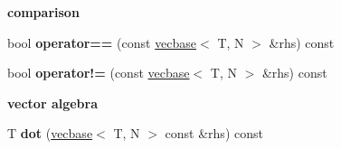 \begin{Indent}{\bf comparison}\par
{\em \label{_amgrp347cd68a17ba31d02e83262794a3c9e3}
 }\begin{DoxyCompactItemize}
\item 
\hypertarget{classmath_1_1vecbase_a81f417a49e0e2c3e4e76b0799cbc0ec2}{
bool {\bfseries operator==} (const \hyperlink{classmath_1_1vecbase}{vecbase}$<$ T, N $>$ \&rhs) const }
\label{classmath_1_1vecbase_a81f417a49e0e2c3e4e76b0799cbc0ec2}

\item 
\hypertarget{classmath_1_1vecbase_acd1de2124460ee7ef9dea51ad7647ea3}{
bool {\bfseries operator!=} (const \hyperlink{classmath_1_1vecbase}{vecbase}$<$ T, N $>$ \&rhs) const }
\label{classmath_1_1vecbase_acd1de2124460ee7ef9dea51ad7647ea3}

\end{DoxyCompactItemize}
\end{Indent}
\begin{Indent}{\bf vector algebra}\par
{\em \label{_amgrpf3df6783d0cca6c1ea518af64ed4d647}
 }\begin{DoxyCompactItemize}
\item 
\hypertarget{classmath_1_1vecbase_a4b96583fae6e131eddefa796b5f31809}{
T {\bfseries dot} (\hyperlink{classmath_1_1vecbase}{vecbase}$<$ T, N $>$ const \&rhs) const }
\label{classmath_1_1vecbase_a4b96583fae6e131eddefa796b5f31809}

\end{DoxyCompactItemize}
\end{Indent}
